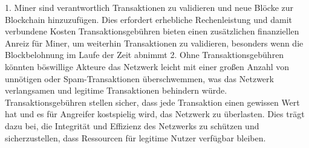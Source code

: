 \documentclass[german]{../uebung}
\begin{document}
\begin{exercise}{5}
    1. Miner sind verantwortlich Transaktionen zu validieren und neue Blöcke zur Blockchain hinzuzufügen. Dies erfordert erhebliche Rechenleistung und damit verbundene Kosten
    Transaktionsgebühren bieten einen zusätzlichen finanziellen Anreiz für Miner, um weiterhin Transaktionen zu validieren, besonders wenn die Blockbelohnung im Laufe der Zeit abnimmt
    2. Ohne Transaktionsgebühren könnten böswillige Akteure das Netzwerk leicht mit einer großen Anzahl von unnötigen oder Spam-Transaktionen überschwemmen, was das Netzwerk verlangsamen und legitime Transaktionen behindern würde.
    Transaktionsgebühren stellen sicher, dass jede Transaktion einen gewissen Wert hat und es für Angreifer kostspielig wird, das Netzwerk zu überlasten.
    Dies trägt dazu bei, die Integrität und Effizienz des Netzwerks zu schützen und sicherzustellen, dass Ressourcen für legitime Nutzer verfügbar bleiben.
\end{exercise}
\end{document}
